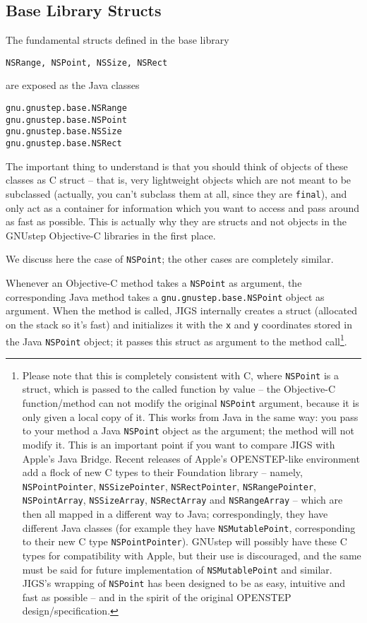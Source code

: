 \subsection{Base Library Structs}
The fundamental structs defined in the base library
\begin{verbatim}
NSRange, NSPoint, NSSize, NSRect
\end{verbatim}
are exposed as the Java classes
\begin{verbatim}
gnu.gnustep.base.NSRange
gnu.gnustep.base.NSPoint
gnu.gnustep.base.NSSize
gnu.gnustep.base.NSRect
\end{verbatim}
The important thing to understand is that you should think of objects
of these classes as C struct -- that is, very lightweight objects
which are not meant to be subclassed (actually, you can't subclass
them at all, since they are \texttt{final}), and only act as a
container for information which you want to access and pass around as
fast as possible.  This is actually why they are structs and not
objects in the GNUstep Objective-C libraries in the first place.

We discuss here the case of \texttt{NSPoint}; the other cases are
completely similar.

Whenever an Objective-C method takes a \texttt{NSPoint} as argument,
the corresponding Java method takes a
\texttt{gnu.gnustep.base.NSPoint} object as argument.  When the method 
is called, JIGS internally creates a struct (allocated on the stack so
it's fast) and initializes it with the \texttt{x} and \texttt{y}
coordinates stored in the Java \texttt{NSPoint} object; it passes this
struct as argument to the method call\footnote{Please note that this
is completely consistent with C, where \texttt{NSPoint} is a struct,
which is passed to the called function by value -- the Objective-C
function/method can not modify the original
\texttt{NSPoint} argument, because it is only given a local copy of
it.  This works from Java in the same way: you pass to your method a
Java \texttt{NSPoint} object as the argument; the method will not
modify it.  This is an important point if you want to compare JIGS
with Apple's Java Bridge.  Recent releases of Apple's OPENSTEP-like
environment add a flock of new C types to their Foundation library --
namely, \texttt{NSPointPointer}, \texttt{NSSizePointer},
\texttt{NSRectPointer}, \texttt{NSRangePointer}, \texttt{NSPointArray}, 
\texttt{NSSizeArray}, \texttt{NSRectArray} and \texttt{NSRangeArray}  
-- which are then all mapped in a different way to Java;
correspondingly, they have different Java classes (for example they
have \texttt{NSMutablePoint}, corresponding to their new C type
\texttt{NSPointPointer}).  GNUstep will possibly have these C types 
for compatibility with Apple, but their use is discouraged, and the
same must be said for future implementation of \texttt{NSMutablePoint}
and similar.  JIGS's wrapping of \texttt{NSPoint} has been designed to
be as easy, intuitive and fast as possible -- and in the spirit of the
original OPENSTEP design/specification.}.

